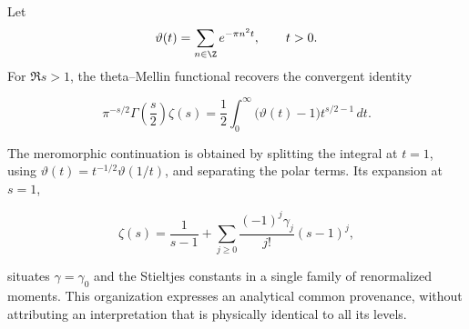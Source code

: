 Let
\[
\vartheta(t)=\sum_{n\in\Z}e^{-\pi n^2t},\qquad t>0.
\]
For \(\Re s>1\), the theta--Mellin functional recovers the convergent identity

\[
\pi^{-s/2}\Gamma\!\left(\frac{s}{2}\right)\zeta(s)
=\frac12\int_0^\infty
\bigl(\vartheta(t)-1\bigr)t^{s/2-1}\,dt.
\]

The meromorphic continuation is obtained by splitting the integral at \(t=1\), using
\(\vartheta(t)=t^{-1/2}\vartheta(1/t)\), and separating the polar terms. Its expansion at \(s=1\),

\begin{equation}
\zeta(s)=\frac1{s-1}+\sum_{j\ge0}
\frac{(-1)^j\gamma_j}{j!}(s-1)^j,
\label{eq:stieltjes}
\end{equation}

situates \(\gamma=\gamma_0\) and the Stieltjes constants in a single
family of renormalized moments. This organization expresses an
analytical common provenance, without attributing an interpretation that is physically identical to all its levels.

